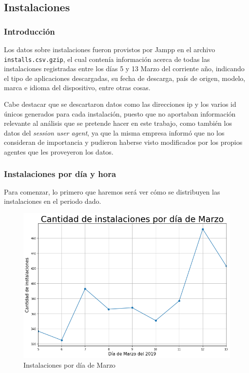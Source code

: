 \documentclass[a4paper, 12pt]{article}
\begin{document}
\clearpage
\subsection{Instalaciones}
	\subsubsection{Introducción}
		Los datos sobre instalaciones fueron provistos por Jampp en el archivo \texttt{installs.csv.gzip}, el cual contenía
		información acerca de todas las instalaciones registradas entre los días 5 y 13  Marzo del corriente año,
		indicando el tipo de aplicaciones descargadas, su fecha de descarga, país de origen, modelo, marca e idioma del dispositivo, entre otras cosas.

		Cabe destacar que se descartaron datos como las direcciones ip y los varios id únicos generados para cada instalación,
		puesto que no aportaban información relevante al análisis que se pretende hacer en este trabajo, como también los datos
		del \textit{session user agent}, ya que la misma empresa informó que no los consideran de importancia y pudieron haberse
		visto modificados por los propios agentes que les proveyeron los datos.

	\subsubsection{Instalaciones por día y hora}
		Para comenzar, lo primero que haremos será ver cómo se distribuyen las instalaciones en el periodo dado.
		\FloatBarrier
		\begin{figure}[h]
			\centering
			\includegraphics[width=\textwidth]{images/installs/installspordia.png}
			\caption{Instalaciones por día de Marzo}
		\end{figure}
		\FloatBarrier
\end{document}
